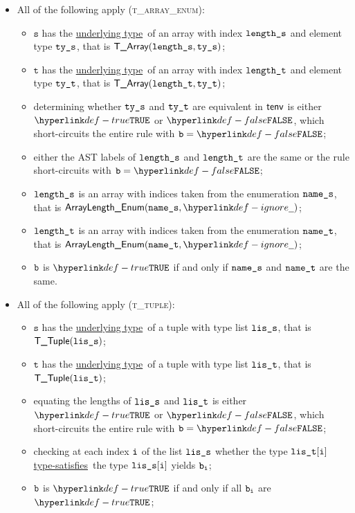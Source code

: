 \documentclass{book}
\newcommand\ProseOrTypeError[0]{\ProseTerminateAs{\TypeErrorConfig}}
\newcommand\underlyingtype[0]{\hyperlink{def-underlyingtype}{underlying type}}
\newcommand\typesatisfies[0]{\hyperlink{def-typesatisfies}{type-satisfies}}
\newcommand\vt[0]{\texttt{t}}
\newcommand\vs[0]{\texttt{s}}
\begin{document}
\begin{itemize}
  \item All of the following apply (\textsc{t\_array\_enum}):
  \begin{itemize}
  \item $\vs$ has the \underlyingtype\ of an array with index $\texttt{length\_s}$ and element type $\texttt{ty\_s}$, that is $\textsf{T\_Array}(\texttt{length\_s}, \texttt{ty\_s})$;
  \item $\vt$ has the \underlyingtype\ of an array with index $\texttt{length\_t}$ and element type $\texttt{ty\_t}$, that is $\textsf{T\_Array}(\texttt{length\_t}, \texttt{ty\_t})$;
  \item determining whether $\texttt{ty\_s}$ and $\texttt{ty\_t}$ are equivalent in $\textsf{tenv}$ is either $\True$
  or $\False$, which short-circuits the entire rule with $\vb=\False$;
  \item either the AST labels of $\texttt{length\_s}$ and $\texttt{length\_t}$ are the same or the rule short-circuits with $\vb=\False$;
  \item $\texttt{length\_s}$ is an array with indices taken from the enumeration $\texttt{name\_s}$, that is $\ArrayLengthEnum(\vnames, \Ignore)$;
  \item $\texttt{length\_t}$ is an array with indices taken from the enumeration $\texttt{name\_t}$, that is $\ArrayLengthEnum(\vnamet, \Ignore)$;
  \item $\texttt{b}$ is $\True$ if and only if $\texttt{name\_s}$ and $\texttt{name\_t}$ are the same.
  \end{itemize}

\item All of the following apply (\textsc{t\_tuple}):
  \begin{itemize}
  \item $\vs$ has the \underlyingtype\ of a tuple with type list $\texttt{lis\_s}$, that is $\textsf{T\_Tuple}(\texttt{lis\_s})$;
  \item $\vt$ has the \underlyingtype\ of a tuple with type list $\texttt{lis\_t}$, that is $\textsf{T\_Tuple}(\texttt{lis\_t})$;
  \item equating the lengths of $\texttt{lis\_s}$ and $\texttt{lis\_t}$ is either $\True$ or $\False$, which short-circuits
  the entire rule with $\vb=\False$;
  \item checking at each index $\texttt{i}$ of the list $\texttt{lis\_s}$ whether the type $\texttt{lis\_t}[\texttt{i}]$ \typesatisfies\ the type $\texttt{lis\_s}[\texttt{i}]$
  yields $\texttt{b}_{\texttt{i}}$\ProseOrTypeError;
  \item $\texttt{b}$ is $\True$ if and only if all $\texttt{b}_{\texttt{i}}$ are $\True$;
  \end{itemize}


\end{itemize}
\end{document}

